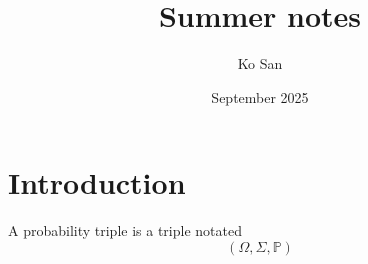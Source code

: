 \documentclass{article}
\title{Summer notes}
\author{Ko San}
\date{September 2025}
\begin{document}
\maketitle

\section{Introduction}

A probability triple is a triple notated $$(\Omega, \Sigma, \mathbb{P})$$
\end{document}
